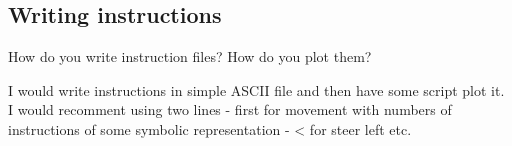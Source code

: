 \subsection{Writing instructions}
How do you write instruction files? How do you plot them?

I would write instructions in simple ASCII file and then have some script plot it. \\
I would recomment using two lines - first for movement with numbers of instructions of some symbolic representation - < for steer left etc. \\

